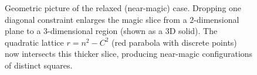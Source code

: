 \documentclass[12pt]{article}
\begin{document}
\begin{figure}[H]

\caption{Geometric picture of the relaxed (near-magic) case. Dropping one
diagonal constraint enlarges the magic slice from a $2$-dimensional plane to a
$3$-dimensional region (shown as a 3D solid). The quadratic lattice
$r=n^2-C^2$ (red parabola with discrete points) now intersects this thicker
slice, producing near-magic configurations of distinct squares.}
\label{fig:relaxed-magic-geometry}
\end{figure}
\end{document}
